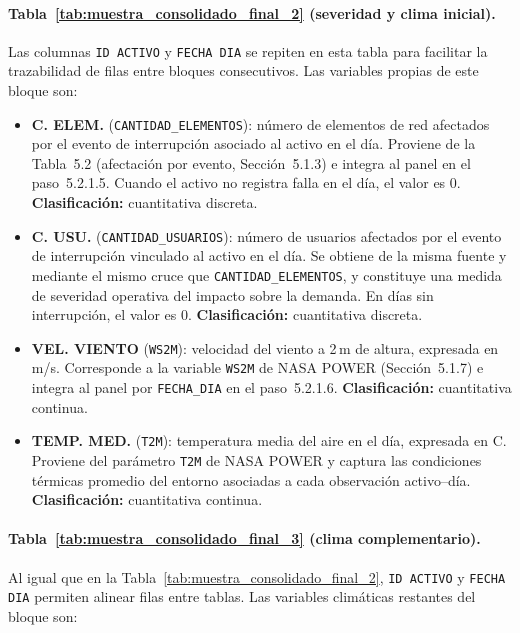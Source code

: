 \paragraph{Tabla~\ref{tab:muestra_consolidado_final_2} (severidad y clima inicial).}
Las columnas \texttt{ID ACTIVO} y \texttt{FECHA DIA} se repiten en esta tabla para facilitar la trazabilidad de filas entre bloques consecutivos. Las variables propias de este bloque son:

\begin{itemize}
    \item \textbf{C. ELEM.} (\texttt{CANTIDAD\_ELEMENTOS}): número de elementos de red afectados por el evento de interrupción asociado al activo en el día. Proviene de la Tabla~5.2 (afectación por evento, Sección~5.1.3) e integra al panel en el paso~5.2.1.5. Cuando el activo no registra falla en el día, el valor es 0. \textbf{Clasificación:} cuantitativa discreta.

    \item \textbf{C. USU.} (\texttt{CANTIDAD\_USUARIOS}): número de usuarios afectados por el evento de interrupción vinculado al activo en el día. Se obtiene de la misma fuente y mediante el mismo cruce que \texttt{CANTIDAD\_ELEMENTOS}, y constituye una medida de severidad operativa del impacto sobre la demanda. En días sin interrupción, el valor es 0. \textbf{Clasificación:} cuantitativa discreta.

    \item \textbf{VEL. VIENTO} (\texttt{WS2M}): velocidad del viento a 2\,m de altura, expresada en m/s. Corresponde a la variable \texttt{WS2M} de NASA POWER (Sección~5.1.7) e integra al panel por \texttt{FECHA\_DIA} en el paso~5.2.1.6. \textbf{Clasificación:} cuantitativa continua.

    \item \textbf{TEMP. MED.} (\texttt{T2M}): temperatura media del aire en el día, expresada en \textdegree C. Proviene del parámetro \texttt{T2M} de NASA POWER y captura las condiciones térmicas promedio del entorno asociadas a cada observación activo--día. \textbf{Clasificación:} cuantitativa continua.
\end{itemize}

\paragraph{Tabla~\ref{tab:muestra_consolidado_final_3} (clima complementario).}
Al igual que en la Tabla~\ref{tab:muestra_consolidado_final_2}, \texttt{ID ACTIVO} y \texttt{FECHA DIA} permiten alinear filas entre tablas. Las variables climáticas restantes del bloque son:

